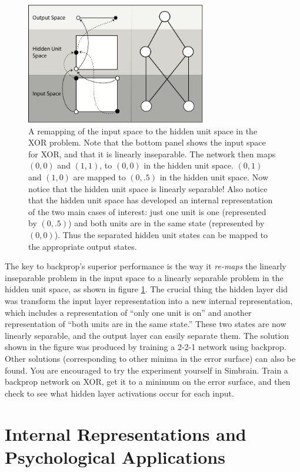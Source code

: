 \begin{figure}[h]
\centering
\includegraphics[width=0.7\textwidth]{images/xor_internal_rep.png}
\caption[Pamela Payne.]{A remapping of the input space to the hidden unit space in the XOR problem. Note that the bottom panel shows the input space for XOR, and that it is linearly inseparable. The network then maps $(0,0)$ and $(1,1)$,  to $(0,0)$ in the hidden unit space. $(0,1)$ and $(1,0)$ are mapped to $(0,.5)$ in the hidden unit space. Now notice that the hidden unit space is linearly separable!  Also notice that the hidden unit space has developed an internal representation of the two main cases of interest: just one unit is one (represented by $(0,.5)$) and both units are in the same state (represented by $(0,0)$). Thus the separated hidden unit states can be mapped to the appropriate output states.}
\label{xor_remapping}
\end{figure}


The key to backprop's superior performance is the way it \emph{re-maps} the linearly inseparable problem in the input space to a linearly separable problem in the hidden unit space, as shown in figure \ref{xor_remapping}. The crucial thing the hidden layer did was transform the input layer representation into a new internal representation, which includes a representation of ``only one unit is on'' and another representation of ``both units are in the same state.''  These two states are now linearly separable, and the output layer can easily separate them. The solution shown in the figure was produced by training a 2-2-1 network using backprop. Other solutions (corresponding to other minima in the error surface) can also be found. You are encouraged to try the experiment yourself in Simbrain. Train a backprop network on XOR, get it to a minimum on the error surface, and then check to see what hidden layer activations occur for each input.

\section{Internal Representations and Psychological Applications}\label{internalRepsFF}

